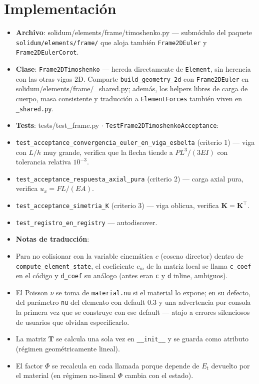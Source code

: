 \documentclass[11pt,letterpaper,oneside]{report}
\begin{document}
\section{Implementación}

\begin{itemize}
  \item \textbf{Archivo}: solidum/elements/frame/timoshenko.py --- submódulo del paquete \texttt{solidum/elements/frame/} que aloja también \texttt{Frame2DEuler} y \texttt{Frame2DEulerCorot}.
  \item \textbf{Clase}: \texttt{Frame2DTimoshenko} --- hereda directamente de \texttt{Element}, sin herencia con las otras vigas 2D. Comparte \texttt{build\_geometry\_2d} con \texttt{Frame2DEuler} en solidum/elements/frame/\_shared.py; además, los helpers libres de carga de cuerpo, masa consistente y traducción a \texttt{ElementForces} también viven en \texttt{\_shared.py}.
  \item \textbf{Tests}: tests/test\_frame.py \ensuremath{\cdot} \texttt{TestFrame2DTimoshenkoAcceptance}:
  \item \texttt{test\_acceptance\_convergencia\_euler\_en\_viga\_esbelta} (criterio 1) --- viga con $L/h$ muy grande, verifica que la flecha tiende a $PL^3/(3EI)$ con tolerancia relativa $10^{-3}$.
  \item \texttt{test\_acceptance\_respuesta\_axial\_pura} (criterio 2) --- carga axial pura, verifica $u_x = FL/(EA)$.
  \item \texttt{test\_acceptance\_simetria\_K} (criterio 3) --- viga oblicua, verifica $\mathbf K = \mathbf K^\top$.
  \item \texttt{test\_registro\_en\_registry} --- autodiscover.
  \item \textbf{Notas de traducción}:
  \item Para no colisionar con la variable cinemática $c$ (coseno director) dentro de \texttt{compute\_element\_state}, el coeficiente $c_m$ de la matriz local se llama \texttt{c\_coef} en el código y \texttt{d\_coef} su análogo (antes eran \texttt{c} y \texttt{d} inline, ambiguos).
  \item El Poisson $\nu$ se toma de \texttt{material.nu} si el material lo expone; en su defecto, del parámetro \texttt{nu} del elemento con default 0.3 y una advertencia por consola la primera vez que se construye con ese default --- atajo a errores silenciosos de usuarios que olvidan especificarlo.
  \item La matriz $\mathbf T$ se calcula una sola vez en \texttt{\_\_init\_\_} y se guarda como atributo (régimen geométricamente lineal).
  \item El factor $\Phi$ se recalcula en cada llamada porque depende de $E_t$ devuelto por el material (en régimen no-lineal $\Phi$ cambia con el estado).
\end{itemize}
\end{document}
